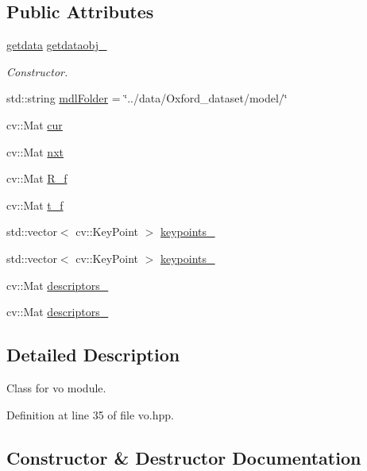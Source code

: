 \subsection*{Public Attributes}
\begin{DoxyCompactItemize}
\item 
\hyperlink{classgetdata}{getdata} \hyperlink{classvo_ac42f9a37e2a255371ae0641561b80de5}{getdataobj\+\_\+}
\begin{DoxyCompactList}\small\item\em Constructor. \end{DoxyCompactList}\item 
std\+::string \hyperlink{classvo_a6cec8c62c2984586bece5102f2d55d02}{mdl\+Folder} = \char`\"{}../data/Oxford\+\_\+dataset/model/\char`\"{}
\item 
cv\+::\+Mat \hyperlink{classvo_aac8fbbf6490232cb02775fad298674cd}{cur}
\item 
cv\+::\+Mat \hyperlink{classvo_ac8de029d16a1894dc7b6bc1b20ff52d9}{nxt}
\item 
cv\+::\+Mat \hyperlink{classvo_a9b0c73504e1fdcf536678755757023db}{R\+\_\+f}
\item 
cv\+::\+Mat \hyperlink{classvo_a59a051419df095f766905047916cf7a0}{t\+\_\+f}
\item 
std\+::vector$<$ cv\+::\+Key\+Point $>$ \hyperlink{classvo_aa56b968f07f89745eef44ea60c0a1fde}{keypoints\+\_}
\item 
std\+::vector$<$ cv\+::\+Key\+Point $>$ \hyperlink{classvo_ac3d7d1e40686a1def952e5b2bdde8086}{keypoints\+\_}
\item 
cv\+::\+Mat \hyperlink{classvo_a927e2c8dd06a377ee2a129b560b2304a}{descriptors\+\_}
\item 
cv\+::\+Mat \hyperlink{classvo_ac5f6dcad86a52c20957698e3fd8d43c1}{descriptors\+\_}
\end{DoxyCompactItemize}


\subsection{Detailed Description}
Class for vo module. 

Definition at line 35 of file vo.\+hpp.



\subsection{Constructor \& Destructor Documentation}
